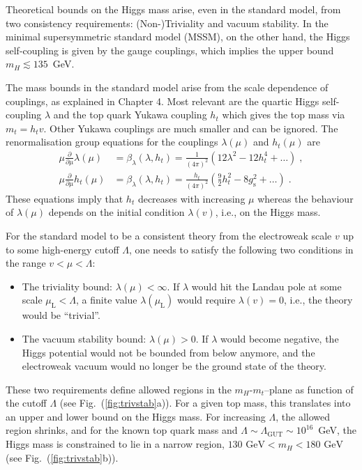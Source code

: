 \documentclass[12pt]{report}
\newcommand{\2}{\ensuremath{\sqrt{2}\,}}
\begin{document}
{      Theoretical bounds on the Higgs mass arise, even in the standard model, from two
      consistency requirements: (Non-)Triviality and vacuum stability. In the minimal supersymmetric
      standard model (MSSM), on the other hand, the Higgs self-coupling is given by the gauge
      couplings, which implies the upper bound $m_H\lesssim 135$~GeV.
      
      The mass bounds in the standard model arise from the scale dependence of couplings, as explained
      in Chapter 4. Most relevant are the quartic Higgs self-coupling $\lambda$ and the top quark 
      Yukawa coupling
      $h_t$ which gives the top mass via $m_t=h_t v$. Other Yukawa couplings are
      much smaller and can be ignored. The renormalisation group equations for 
      the couplings $\lambda(\mu)$ and $h_t(\mu)$ are
      \begin{subequations}
        \begin{align}
          \mu \frac{\partial }{\partial \mu} \lambda\!\left(\mu\right) &=
          \beta_\lambda\!\left(\lambda,h_t\right) =\frac{1}{\left(4\pi\right)^2} \left(12 \lambda^2
            -12 h_t^4  +\ldots\right)\;, \\
          \mu \frac{\partial }{\partial \mu} h_t\!\left(\mu\right) &=
          \beta_\lambda\!\left(\lambda,h_t\right) = \frac{h_t}{\left(4\pi\right)^2}
          \left(\frac{9}{2}h_t^2 -8 g_\text{s}^2 +\ldots\right)\;.
        \end{align}
      \end{subequations}
      These equations imply that $h_t$ decreases with increasing $\mu$ whereas the behaviour of
      $\lambda(\mu)$ depends on the initial condition $\lambda(v)$, i.e., on the Higgs mass.

      For the standard model to be a consistent theory from the electroweak scale $v$ up to
      some high-energy cutoff $\Lambda$, one needs to satisfy the following two conditions in
      the range $v<\mu<\Lambda$:
      \begin{itemize}
        \item The triviality bound: $\lambda\!\left(\mu\right)<\infty$. If $\lambda$ would
          hit the Landau pole at some scale $\mu_\text{L} < \Lambda$, a finite value
          $\lambda(\mu_\text{L})$ would require $\lambda(v)=0$, i.e., the theory would be
          ``trivial''. 
        \item The vacuum stability bound: $\lambda\!\left(\mu\right)>0$. If $\lambda$ would become
          negative, the Higgs potential would not be bounded from below anymore, and the electroweak
          vacuum would no longer be the ground state of the theory.
      \end{itemize}
      These two requirements define allowed regions in the $m_H$-$m_t$--plane as function of the
      cutoff $\Lambda$ (see Fig.~(\ref{fig:trivstab}a)).
      For a given
      top mass, this translates into an upper and lower bound on the Higgs mass.
      For increasing $\Lambda$, the allowed
      region shrinks, and for the known top quark mass and $\Lambda\sim\Lambda_\text{GUT}\sim
      10^{16}$~GeV, the Higgs mass is constrained to lie in a narrow region, $130\text{~GeV}<m_H
      <180\text{~GeV}$ (see Fig.~(\ref{fig:trivstab}b)). 
      
}
\end{document}
